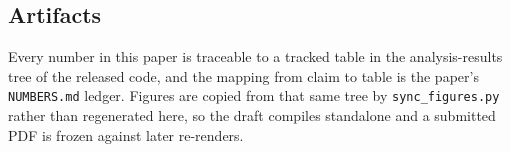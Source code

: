 \subsection{Artifacts}

Every number in this paper is traceable to a tracked table in the analysis-results tree of the
released code, and the mapping from claim to table is the paper's \texttt{NUMBERS.md} ledger.
Figures are copied from that same tree by \texttt{sync\_figures.py} rather than regenerated here,
so the draft compiles standalone and a submitted PDF is frozen against later re-renders.
